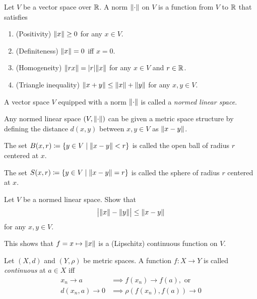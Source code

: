 \begin{definition}[norm] \label{def:norm}
    Let $V$ be a vector space over $\R$.
    A norm $\norm{\cdot}$ on $V$ is a function from $V$ to $\R$ that
    satisfies
    \begin{enumerate}[label=(N\arabic*)]
        \item (Positivity) $\norm{x} \ge 0$ for any $x \in V$.
        \item (Definiteness) $\norm{x} = 0$ iff $x = 0$.
        \item (Homogeneity) $\norm{r x} = \abs{r} \norm{x}$
            for any $x \in V$ and $r \in \R$.
        \item (Triangle inequality) $\norm{x + y} \le \norm{x} + \norm{y}$
            for any $x, y \in V$.
    \end{enumerate}
\end{definition}

\begin{definition} \label{def:nls}
    A vector space $V$ equipped with a norm $\norm{\cdot}$ is called
    a \emph{normed linear space}.
\end{definition}

\begin{remark}
    Any normed linear space $(V, \norm{\cdot})$ can be given a metric
    space structure by defining the distance $d(x, y)$ between $x, y \in V$
    as $\norm{x - y}$.

    The set $B(x, r) \coloneq \set{y \in V \mid \norm{x - y} < r}$ is called
    the open ball of radius $r$ centered at $x$.

    The set $S(x, r) \coloneq \set{y \in V \mid \norm{x - y} = r}$ is called
    the sphere of radius $r$ centered at $x$.
\end{remark}

\begin{exercise} \label{thm:rti}
    Let $V$ be a normed linear space.
    Show that \[
        \abs[\big]{\norm{x} - \norm{y}} \le \norm{x - y}
    \] for any $x, y \in V$.
\end{exercise}

This shows that $f = x \mapsto \norm{x}$ is a (Lipschitz) continuous
function on $V$.

\begin{definition}[continuity] \label{def:continuity}
    Let $(X, d)$ and $(Y, \rho)$ be metric spaces.
    A function $f\colon X \to Y$ is called \emph{continuous} at $a \in X$
    iff \begin{align*}
        x_n \to a &\implies f(x_n) \to f(a), \text{ or} \\
        d(x_n, a) \to 0 &\implies \rho(f(x_n), f(a)) \to 0
    \end{align*}
\end{definition}

